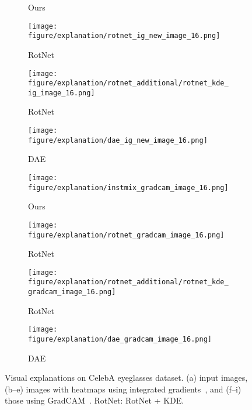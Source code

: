\documentclass{article} \usepackage{iclr2021_conference,times}
\begin{document}
\begin{figure}[h!]
\begin{subfigure}{.11\textwidth}
  \caption{Ours}
\end{subfigure}
\hspace{-2mm}
\begin{subfigure}{.11\textwidth}
  \centering
  \texttt{[image: figure/explanation/rotnet\_ig\_new\_image\_16.png]}
  \caption{RotNet}
\end{subfigure}
\hspace{-2mm}
\begin{subfigure}{.11\textwidth}
  \centering
  \texttt{[image: figure/explanation/rotnet\_additional/rotnet\_kde\_ig\_image\_16.png]}
  \caption{RotNet}
\end{subfigure}
\hspace{-2mm}
\begin{subfigure}{.11\textwidth}
  \centering
  \texttt{[image: figure/explanation/dae\_ig\_new\_image\_16.png]}
  \caption{DAE}
\end{subfigure}
\hspace{-2mm}
\begin{subfigure}{.11\textwidth}
  \centering
  \texttt{[image: figure/explanation/instmix\_gradcam\_image\_16.png]}
  \caption{Ours}
\end{subfigure}
\hspace{-2mm}
\begin{subfigure}{.11\textwidth}
  \centering
  \texttt{[image: figure/explanation/rotnet\_gradcam\_image\_16.png]}
  \caption{RotNet}
\end{subfigure}
\hspace{-2mm}
\begin{subfigure}{.11\textwidth}
  \centering
  \texttt{[image: figure/explanation/rotnet\_additional/rotnet\_kde\_gradcam\_image\_16.png]}
  \caption{RotNet}
\end{subfigure}
\hspace{-2mm}
\begin{subfigure}{.11\textwidth}
  \centering
  \texttt{[image: figure/explanation/dae\_gradcam\_image\_16.png]}
  \caption{DAE}
\end{subfigure}
\caption{Visual explanations on CelebA eyeglasses dataset. (a) input images, (b--e) images with heatmaps using integrated gradients~\citep{sundararajan2017axiomatic}, and (f--i) those using GradCAM~\citep{selvaraju2017grad}. RotNet: RotNet + KDE.}
\label{fig:visual_explanation_celeba_1}
\end{figure}
\end{document}
